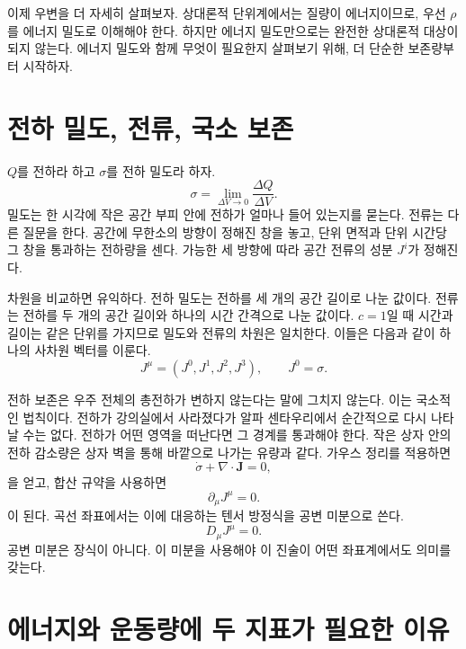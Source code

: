 이제 우변을 더 자세히 살펴보자. 상대론적 단위계에서는 질량이 에너지이므로, 우선 \(\rho\)를 에너지 밀도로 이해해야 한다. 하지만 에너지 밀도만으로는 완전한 상대론적 대상이 되지 않는다. 에너지 밀도와 함께 무엇이 필요한지 살펴보기 위해, 더 단순한 보존량부터 시작하자.

\section{전하 밀도, 전류, 국소 보존}

\(Q\)를 전하라 하고 \(\sigma\)를 전하 밀도라 하자.
\begin{equation}
 \sigma=\lim_{\Delta V\to0}\frac{\Delta Q}{\Delta V}.
\end{equation}
밀도는 한 시각에 작은 공간 부피 안에 전하가 얼마나 들어 있는지를 묻는다. 전류는 다른 질문을 한다. 공간에 무한소의 방향이 정해진 창을 놓고, 단위 면적과 단위 시간당 그 창을 통과하는 전하량을 센다. 가능한 세 방향에 따라 공간 전류의 성분 \(J^i\)가 정해진다.

차원을 비교하면 유익하다. 전하 밀도는 전하를 세 개의 공간 길이로 나눈 값이다. 전류는 전하를 두 개의 공간 길이와 하나의 시간 간격으로 나눈 값이다. \(c=1\)일 때 시간과 길이는 같은 단위를 가지므로 밀도와 전류의 차원은 일치한다. 이들은 다음과 같이 하나의 사차원 벡터를 이룬다.
\begin{equation}
 J^\mu=(J^0,J^1,J^2,J^3),
 \qquad J^0=\sigma.
\end{equation}

전하 보존은 우주 전체의 총전하가 변하지 않는다는 말에 그치지 않는다. 이는 국소적인 법칙이다. 전하가 강의실에서 사라졌다가 알파 센타우리에서 순간적으로 다시 나타날 수는 없다. 전하가 어떤 영역을 떠난다면 그 경계를 통과해야 한다. 작은 상자 안의 전하 감소량은 상자 벽을 통해 바깥으로 나가는 유량과 같다. 가우스 정리를 적용하면
\begin{equation}
 \dot{\sigma}+\nabla\cdot\mathbf{J}=0,
\end{equation}
을 얻고, 합산 규약을 사용하면
\begin{equation}
 \partial_\mu J^\mu=0.
 \label{eq:charge-continuity}
\end{equation}
이 된다. 곡선 좌표에서는 이에 대응하는 텐서 방정식을 공변 미분으로 쓴다.
\begin{equation}
 D_\mu J^\mu=0.
\end{equation}
공변 미분은 장식이 아니다. 이 미분을 사용해야 이 진술이 어떤 좌표계에서도 의미를 갖는다.

\section{에너지와 운동량에 두 지표가 필요한 이유}

